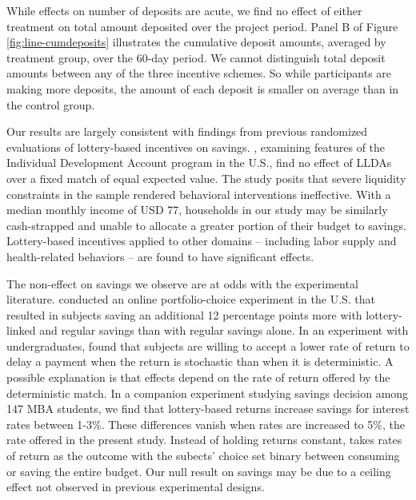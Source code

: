 \documentclass[12pt]{article}
\begin{document}

		While effects on number of deposits are acute, we find no effect of either treatment on total amount deposited over the project period. Panel B of Figure \ref{fig:line-cumdeposits} illustrates the cumulative deposit amounts, averaged by treatment group, over the 60-day period. We cannot distinguish total deposit amounts between any of the three incentive schemes. So while participants are making more deposits, the amount of each deposit is smaller on average than in the control group.

		Our results are largely consistent with findings from previous randomized evaluations of lottery-based incentives on savings. , examining features of the Individual Development Account program in the U.S., find no effect of LLDAs over a fixed match of equal expected value. The study posits that severe liquidity constraints in the sample rendered behavioral interventions ineffective. With a median monthly income of USD 77, households in our study may be similarly cash-strapped and unable to allocate a greater portion of their budget to savings. Lottery-based incentives applied to other domains -- including labor supply  and health-related behaviors  -- are found to have significant effects.


		The non-effect on savings we observe are at odds with the experimental literature.  conducted an online portfolio-choice experiment in the U.S. that resulted in subjects saving an additional 12 percentage points more with lottery-linked and regular savings than with regular savings alone. In an experiment with undergraduates,  found that subjects are willing to accept a lower rate of return to delay a payment when the return is stochastic than when it is deterministic. A possible explanation is that effects depend on the rate of return offered by the deterministic match. In a companion experiment studying savings decision among 147 MBA students, we find that lottery-based returns increase savings for interest rates between 1-3\%. These differences vanish when rates are increased to 5\%, the rate offered in the present study. Instead of holding returns constant,  takes rates of return as the outcome with the subects' choice set binary between consuming or saving the entire budget. Our null result on savings may be due to a ceiling effect not observed in previous experimental designs.
\end{document}
